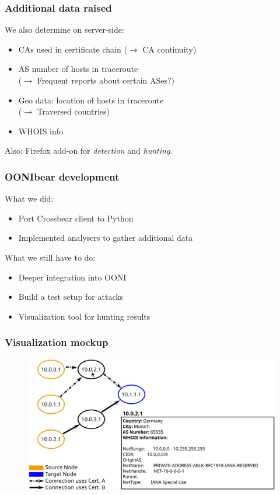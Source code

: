 \begin{frame}
  \frametitle{Additional data raised}
  \begin{block}{We also determine on server-side:}
    \begin{itemize}
    \item CAs used in certificate chain ($\rightarrow$ CA continuity)
    \item AS number of hosts in traceroute \\ ($\rightarrow$ Frequent
      reports about certain ASes?)
    \item Geo data: location of hosts in traceroute \\ ($\rightarrow$ Traversed countries)
    \item WHOIS info
    \end{itemize}
  \end{block}

  Also: Firefox add-on for \textit{detection} and \textit{hunting}.
\end{frame}

\begin{frame}
  \frametitle{OONIbear development}
  \begin{block}{What we did:}
    \begin{itemize}
    \item Port Crossbear client to Python
    \item Implemented analysers to gather additional data
    \end{itemize}
  \end{block}
  \begin{block}{What we still have to do:}
    \begin{itemize}
    \item Deeper integration into OONI
    \item Build a test setup for attacks
    \item Visualization tool for hunting results
    \end{itemize}
  \end{block}
\end{frame}

\begin{frame}
  \frametitle{Visualization mockup}
  \vspace{0.1\textheight}
  \begin{figure}[t]
    \centering
    \includegraphics[width=.8\textwidth]{figures/Mockup-1}
  \end{figure}
\end{frame}

